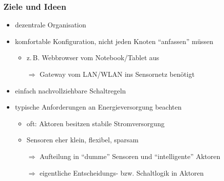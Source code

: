 \documentclass{beamer}
\newcommand{\customitemsep}{7pt}
\newcommand{\customitemsepsub}{2pt}
\begin{document}
\begin{frame}
    \frametitle{Ziele und Ideen}

		    \begin{itemize} \setlength{\itemsep}{\customitemsep}
		        \item dezentrale Organisation
		        \item komfortable Konfiguration, nicht jeden Knoten \enquote{anfassen} müssen
		            \begin{itemize} \setlength{\itemsep}{\customitemsepsub}
		                \item z.\,B. Webbrowser vom Notebook/Tablet aus
		                \item[$\Rightarrow$] Gateway vom LAN/WLAN ins Sensornetz benötigt
		            \end{itemize}

		        \pause
		        \item einfach nachvollziehbare Schaltregeln
		        \item typische Anforderungen an Energieversorgung beachten
		            \begin{itemize} \setlength{\itemsep}{\customitemsepsub}
		                \item oft: Aktoren besitzen stabile Stromversorgung
		                \item Sensoren eher klein, flexibel, sparsam
		                \item[$\Rightarrow$] Aufteilung in \enquote{dumme} Sensoren und \enquote{intelligente} Aktoren
		                \item[$\Rightarrow$] eigentliche Entscheidungs- bzw. Schaltlogik in Aktoren
		            \end{itemize}

		    \end{itemize}
\end{frame}
\end{document}
